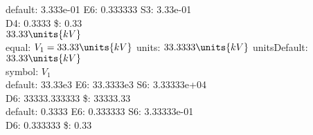 
default: 3.333e-01 E6: 0.333333 S3: 3.33e-01\\
D4: 0.3333 \$: 0.33\\

\mbox{$33.33 \units{k V}$} \\
equal: \mbox{$V_{1}=\mbox{$33.33 \units{k V}$}$} units: \mbox{$33.3333 \units{k V}$} unitsDefault: \mbox{$33.33 \units{k V}$}\\
symbol: \mbox{$V_{1}$}\\

default: 33.33e3 E6: 33.3333e3 S6: 3.33333e+04\\
D6: 33333.333333 \$: 33333.33\\

default: 0.3333 E6: 0.333333 S6: 3.33333e-01\\
D6: 0.333333 \$: 0.33\\

